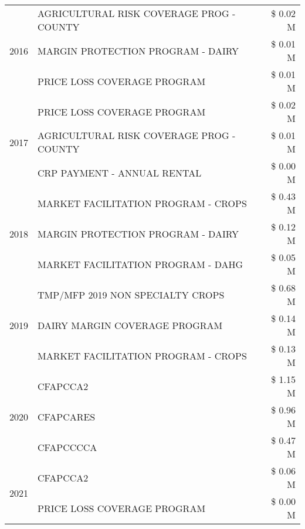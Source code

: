 \begin{tabular}{llr}
\cline{1-3}
\multirow[t]{3}{*}{2016} & AGRICULTURAL RISK COVERAGE PROG - COUNTY & \$ 0.02 M \\
 & MARGIN PROTECTION PROGRAM - DAIRY & \$ 0.01 M \\
 & PRICE LOSS COVERAGE PROGRAM & \$ 0.01 M \\
\cline{1-3}
\multirow[t]{3}{*}{2017} & PRICE LOSS COVERAGE PROGRAM & \$ 0.02 M \\
 & AGRICULTURAL RISK COVERAGE PROG - COUNTY & \$ 0.01 M \\
 & CRP PAYMENT - ANNUAL RENTAL & \$ 0.00 M \\
\cline{1-3}
\multirow[t]{3}{*}{2018} & MARKET FACILITATION PROGRAM - CROPS & \$ 0.43 M \\
 & MARGIN PROTECTION PROGRAM - DAIRY & \$ 0.12 M \\
 & MARKET FACILITATION PROGRAM - DAHG & \$ 0.05 M \\
\cline{1-3}
\multirow[t]{3}{*}{2019} & TMP/MFP 2019 NON SPECIALTY CROPS & \$ 0.68 M \\
 & DAIRY MARGIN COVERAGE PROGRAM & \$ 0.14 M \\
 & MARKET FACILITATION PROGRAM - CROPS & \$ 0.13 M \\
\cline{1-3}
\multirow[t]{3}{*}{2020} & CFAPCCA2 & \$ 1.15 M \\
 & CFAPCARES & \$ 0.96 M \\
 & CFAPCCCCA & \$ 0.47 M \\
\cline{1-3}
\multirow[t]{2}{*}{2021} & CFAPCCA2 & \$ 0.06 M \\
 & PRICE LOSS COVERAGE PROGRAM & \$ 0.00 M \\
\cline{1-3}
\bottomrule
\end{tabular}

